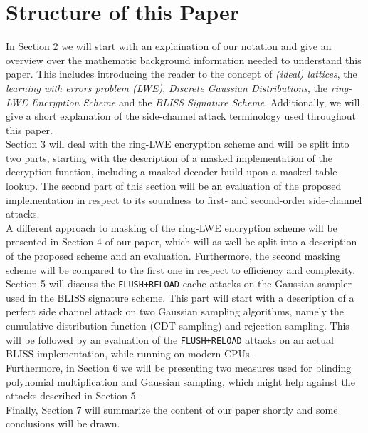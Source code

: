 \section{Structure of this Paper}
In Section 2 we will start with an explaination of our notation and give an overview over the mathematic background information needed to understand this paper. This includes introducing the reader to the concept of \textit{(ideal) lattices}, the \textit{learning with errors problem (LWE)}, \textit{Discrete Gaussian Distributions}, the \textit{ring-LWE Encryption Scheme} and the \textit{BLISS Signature Scheme}. Additionally, we will give a short explanation of the side-channel attack terminology used throughout this paper.\\ 
Section 3 will deal with the ring-LWE encryption scheme and will be split into two parts, starting with the description of a masked implementation of the decryption function, including a masked decoder build upon a masked table lookup. The second part of this section will be an evaluation of the proposed implementation in respect to its soundness to first- and second-order side-channel attacks.\\ 
A different approach to masking of the ring-LWE encryption scheme will be presented in Section 4 of our paper, which will as well be split into a description of the proposed scheme and an evaluation. Furthermore, the second masking scheme will be compared to the first one in respect to efficiency and complexity.\\
Section 5 will discuss the \verb|FLUSH+RELOAD| cache attacks on the Gaussian sampler used in the BLISS signature scheme. This part will start with a description of a perfect side channel attack on two Gaussian sampling algorithms, namely the cumulative distribution function (CDT sampling) and rejection sampling. This will be followed by an evaluation of the \verb|FLUSH+RELOAD| attacks on an actual BLISS implementation, while running on modern CPUs.\\
Furthermore, in Section 6 we will be presenting two measures used for blinding polynomial multiplication and Gaussian sampling, which might help against the attacks described in Section 5.\\
Finally, Section 7 will summarize the content of our paper shortly and some conclusions will be drawn.